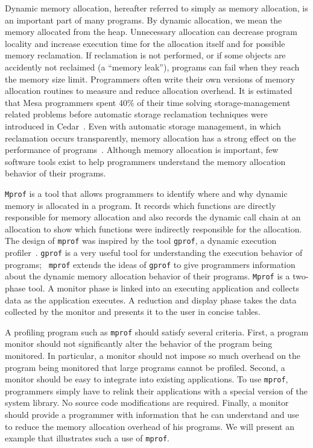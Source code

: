 Dynamic memory allocation, hereafter referred to simply as memory
allocation, is an important part of many programs.  By dynamic
allocation, we mean the memory allocated from the heap.  Unnecessary
allocation can decrease program locality and increase execution time
for the allocation itself and for possible memory reclamation.  If
reclamation is not performed, or if some objects are accidently not
reclaimed (a ``memory leak''), programs can fail when they reach the
memory size limit.  Programmers often write their own versions of
memory allocation routines to measure and reduce allocation overhead.
It is estimated that Mesa programmers spent 40\% of their time solving
storage-management related problems before automatic storage
reclamation techniques were introduced in Cedar~\cite{rovner85:gc}.
Even with automatic storage management, in which reclamation occurs
transparently, memory allocation has a strong effect on the
performance of programs~\cite{moon84:gc}.  Although memory allocation
is important, few software tools exist to help programmers understand
the memory allocation behavior of their programs.

{\tt Mprof} is a tool that allows programmers to identify where and
why dynamic memory is allocated in a program.  It records which
functions are directly responsible for memory allocation and also
records the dynamic call chain at an allocation to show which
functions were indirectly responsible for the allocation.  The design
of {\tt mprof} was inspired by the tool {\tt gprof}, a dynamic
execution profiler~\cite{graham83:gprof}.  {\tt gprof} is a very
useful tool for understanding the execution behavior of programs; {\tt
mprof} extends the ideas of {\tt gprof} to give programmers
information about the dynamic memory allocation behavior of their
programs. {\tt Mprof} is a two-phase tool.  A monitor phase is linked
into an executing application and collects data as the application
executes.  A reduction and display phase takes the data collected by
the monitor and presents it to the user in concise tables.

A profiling program such as {\tt mprof} should satisfy several
criteria.  First, a program monitor should not significantly alter the
behavior of the program being monitored.  In particular, a monitor
should not impose so much overhead on the program being monitored that
large programs cannot be profiled.  Second, a monitor should be easy
to integrate into existing applications.  To use {\tt mprof},
programmers simply have to relink their applications with a special
version of the system library.  No source code modifications are
required.  Finally, a monitor should provide a programmer with
information that he can understand and use to reduce the memory
allocation overhead of his programs.  We will present an example that
illustrates such a use of {\tt mprof}.

